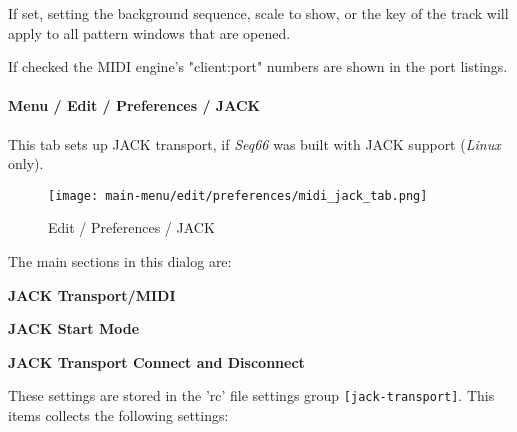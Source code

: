    If set, setting the background sequence, scale to show, or the key of the
   track will apply to all pattern windows that are opened.

   If checked the MIDI engine's "client:port" numbers are shown in the port
   listings.
 
\paragraph{Menu / Edit / Preferences / JACK}
\label{paragraph:menu_edit_preferences_jack}

   This tab sets up JACK transport, if \textsl{Seq66}
   was built with JACK support (\textsl{Linux} only).

\begin{figure}[H]
   \centering 
   \texttt{[image: main-menu/edit/preferences/midi\_jack\_tab.png]}
   \caption{Edit / Preferences / JACK}
   \label{fig:midi_jack_tab}
\end{figure}

   The main sections in this dialog are:

   \begin{enumber}
      \item \textbf{JACK Transport/MIDI}
      \item \textbf{JACK Start Mode}
      \item \textbf{JACK Transport Connect and Disconnect}
   \end{enumber}

   \setcounter{ItemCounter}{0}      %

   These settings are stored in the 'rc' file settings group
   \texttt{[jack-transport]}.
   This items collects the following settings:

